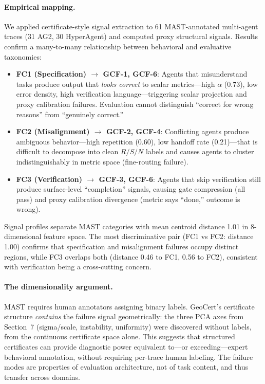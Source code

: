 \documentclass{article}
\begin{document}
\paragraph{Empirical mapping.} We applied certificate-style signal extraction to 61 MAST-annotated multi-agent traces (31 AG2, 30 HyperAgent) and computed proxy structural signals. Results confirm a many-to-many relationship between behavioral and evaluative taxonomies:

\begin{itemize}
    \item \textbf{FC1 (Specification) $\rightarrow$ GCF-1, GCF-6}: Agents that misunderstand tasks produce output that \emph{looks correct} to scalar metrics---high $\alpha$ (0.73), low error density, high verification language---triggering scalar projection and proxy calibration failures. Evaluation cannot distinguish ``correct for wrong reasons'' from ``genuinely correct.''
    \item \textbf{FC2 (Misalignment) $\rightarrow$ GCF-2, GCF-4}: Conflicting agents produce ambiguous behavior---high repetition (0.60), low handoff rate (0.21)---that is difficult to decompose into clean $R/S/N$ labels and causes agents to cluster indistinguishably in metric space (fine-routing failure).
    \item \textbf{FC3 (Verification) $\rightarrow$ GCF-3, GCF-6}: Agents that skip verification still produce surface-level ``completion'' signals, causing gate compression (all pass) and proxy calibration divergence (metric says ``done,'' outcome is wrong).
\end{itemize}

Signal profiles separate MAST categories with mean centroid distance 1.01 in 8-dimensional feature space. The most discriminative pair (FC1 vs FC2: distance 1.00) confirms that specification and misalignment failures occupy distinct regions, while FC3 overlaps both (distance 0.46 to FC1, 0.56 to FC2), consistent with verification being a cross-cutting concern.

\paragraph{The dimensionality argument.} MAST requires human annotators assigning binary labels. GeoCert's certificate structure \emph{contains} the failure signal geometrically: the three PCA axes from Section~7 (sigma/scale, instability, uniformity) were discovered without labels, from the continuous certificate space alone. This suggests that structured certificates can provide diagnostic power equivalent to---or exceeding---expert behavioral annotation, without requiring per-trace human labeling. The failure modes are properties of evaluation architecture, not of task content, and thus transfer across domains.
\end{document}
